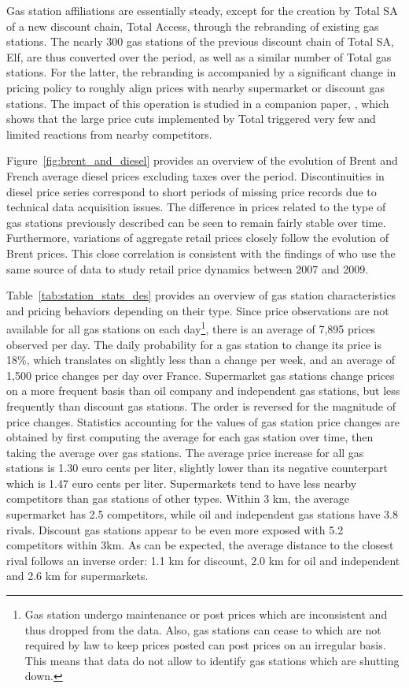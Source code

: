 \documentclass[english]{article}
\begin{document}
Gas station affiliations are essentially steady, except for the creation by Total SA of a new discount chain, Total Access, through the rebranding of existing gas stations. The nearly 300 gas stations of the previous discount chain of Total SA, Elf, are thus converted over the period, as well as a similar number of Total gas stations. For the latter, the rebranding is accompanied by a significant change in pricing policy to roughly align prices with nearby supermarket or discount gas stations. The impact of this operation is studied in a companion paper, \cite{CHA16}, which shows that the large price cuts implemented by Total triggered very few and limited reactions from nearby competitors.

Figure~\ref{fig:brent_and_diesel} provides an overview of the evolution of Brent and French average diesel prices excluding taxes over the period. Discontinuities in diesel price series correspond to short periods of missing price records due to technical data acquisition issues. The difference in prices related to the type of gas stations previously described can be seen to remain fairly stable over time. Furthermore, variations of aggregate retail prices closely follow the evolution of Brent prices. This close correlation is consistent with the findings of \cite{GAU15} who use the same source of data to study retail price dynamics between 2007 and 2009.

Table~\ref{tab:station_stats_des} provides an overview of gas station characteristics and pricing behaviors depending on their type. Since price observations are not available for all gas stations on each day\footnote{Gas station undergo maintenance or post prices which are inconsistent and thus dropped from the data. Also, gas stations can cease to which are not required by law to keep prices posted can post prices on an irregular basis. This means that data do not allow to identify gas stations which are shutting down.}, there is an average of 7,895 prices observed per day. The daily probability for a gas station to change its price is 18\%, which translates on slightly less than a change per week, and an average of 1,500 price changes per day over France. Supermarket gas stations change prices on a more frequent basis than oil company and independent gas stations, but less frequently than discount gas stations. The order is reversed for the magnitude of price changes. Statistics accounting for the values of gas station price changes are obtained by first computing the average for each gas station over time, then taking the average over gas stations. The average price increase for all gas stations is 1.30 euro cents per liter, slightly lower than its negative counterpart which is 1.47 euro cents per liter. Supermarkets tend to have less nearby competitors than gas stations of other types. Within 3 km, the average supermarket has 2.5 competitors, while oil and independent gas stations have 3.8 rivals. Discount gas stations appear to be even more exposed with 5.2 competitors within 3km. As can be expected, the average distance to the closest rival follows an inverse order: 1.1 km for discount, 2.0 km for oil and independent and 2.6 km for supermarkets.
\end{document}
